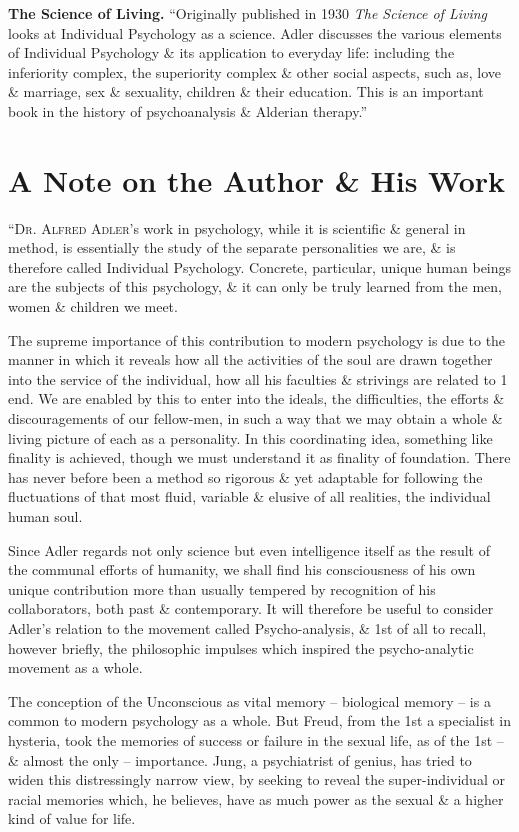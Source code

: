 \documentclass{article}
\begin{document}
\textbf{\textsf{The Science of Living.}} ``Originally published in 1930 \textit{The Science of Living} looks at Individual Psychology as a science. Adler discusses the various elements of Individual Psychology \& its application to everyday life: including the inferiority complex, the superiority complex \& other social aspects, such as, love \& marriage, sex \& sexuality, children \& their education. This is an important book in the history of psychoanalysis \& Alderian therapy.''

\section*{A Note on the Author \& His Work}
``\textsc{Dr. Alfred Adler}'s work in psychology, while it is scientific \& general in method, is essentially the study of the separate personalities we are, \& is therefore called Individual Psychology. Concrete, particular, unique human beings are the subjects of this psychology, \& it can only be truly learned from the men, women \& children we meet.

The supreme importance of this contribution to modern psychology is due to the manner in which it reveals how all the activities of the soul are drawn together into the service of the individual, how all his faculties \& strivings are related to 1 end. We are enabled by this to enter into the ideals, the difficulties, the efforts \& discouragements of our fellow-men, in such a way that we may obtain a whole \& living picture of each as a personality. In this coordinating idea, something like finality is achieved, though we must understand it as finality of foundation. There has never before been a method so rigorous \& yet adaptable for following the fluctuations of that most fluid, variable \& elusive of all realities, the individual human soul.

Since Adler regards not only science but even intelligence itself as the result of the communal efforts of humanity, we shall find his consciousness of his own unique contribution more than usually tempered by recognition of his collaborators, both past \& contemporary. It will therefore be useful to consider Adler's relation to the movement called Psycho-analysis, \& 1st of all to recall, however briefly, the philosophic impulses which inspired the psycho-analytic movement as a whole.

The conception of the Unconscious as vital memory -- biological memory -- is a common to modern psychology as a whole. But Freud, from the 1st a specialist in hysteria, took the memories of success or failure in the sexual life, as of the 1st -- \& almost the only -- importance. Jung, a psychiatrist of genius, has tried to widen this distressingly narrow view, by seeking to reveal the super-individual or racial memories which, he believes, have as much power as the sexual \& a higher kind of value for life.
\end{document}
